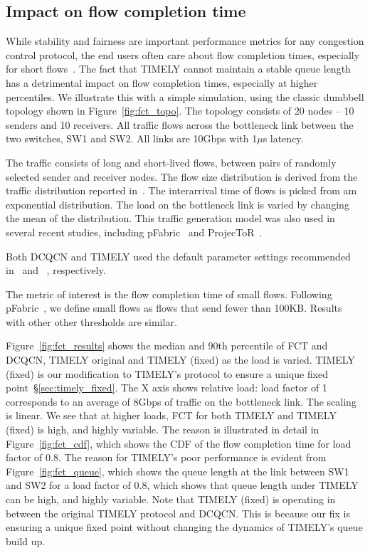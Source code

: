 \subsection {Impact on flow completion time}

While stability and fairness are important performance metrics for any
congestion control protocol, the end users often care about flow completion
times, especially for short flows~\cite{rcp}. The fact that TIMELY cannot
maintain a stable queue length has a detrimental impact on flow completion
times, especially at higher percentiles. We illustrate this with a simple
simulation, using the classic dumbbell topology shown in
Figure~\ref{fig:fct_topo}. The topology consists of 20 nodes -- 10 senders and
10 receivers. All traffic flows across the bottleneck link between the two
switches, SW1 and SW2. All links are 10Gbps with 1$\mu$s latency.

The traffic consists  of long and short-lived flows, between pairs of randomly
selected sender and receiver nodes. The flow size distribution is derived from
the traffic distribution reported in~\cite{dctcp}. The interarrival time of
flows is picked from am exponential distribution. The load on the bottleneck
link is varied by changing the mean of the distribution. This traffic generation
model was also used in several recent studies, including pFabric~\cite{pfabric}
and ProjecToR~\cite{projector}. 

Both DCQCN and TIMELY used the default parameter settings recommended
in~\cite{dcqcn} and ~\cite{timely}, respectively. 

The metric of interest is the flow completion time of small flows. Following pFabric~\cite{pfabric}, we define small flows as flows that send fewer than 100KB. Results with other other
thresholds are similar.

Figure~\ref{fig:fct_results} shows the median and 90th percentile of FCT and
DCQCN, TIMELY original and TIMELY (fixed) as the load is varied. TIMELY (fixed) is our modification to TIMELY's protocol to ensure a unique fixed point~\S\ref{sec:timely_fixed}. The X axis shows relative load: load factor of 1 corresponds to an average of 8Gbps of traffic on the bottleneck link. The scaling is linear. We see that at higher loads, FCT for both TIMELY and TIMELY (fixed) is high, and highly variable. The reason is illustrated in detail in Figure~\ref{fig:fct_cdf}, which shows the CDF of the flow completion time for
load factor of 0.8. The reason for TIMELY's poor performance is evident from
Figure~\ref{fig:fct_queue}, which shows the queue length at the link between
SW1 and SW2 for a load factor of 0.8, which shows that queue length under TIMELY
can be high, and highly variable. Note that TIMELY (fixed) is operating in between the original TIMELY protocol and DCQCN. This is because our fix is ensuring a unique fixed point without changing the dynamics of TIMELY's queue build up. 

